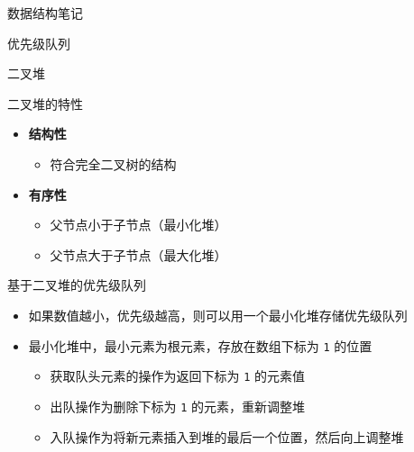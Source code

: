 \documentclass[
  ignorenonframetext,
]{beamer}
\providecommand{\tightlist}{%
  \setlength{\itemsep}{0pt}\setlength{\parskip}{0pt}}
\begin{document}
\begin{frame}[fragile]{数据结构笔记}
\begin{block}{优先级队列}
\begin{block}{二叉堆}
\begin{block}{二叉堆的特性}
\protect{}\label{ux4e8cux53c9ux5806ux7684ux7279ux6027}
\begin{itemize}
\tightlist
\item
  \textbf{结构性}

  \begin{itemize}
  \tightlist
  \item
    符合完全二叉树的结构
  \end{itemize}
\item
  \textbf{有序性}

  \begin{itemize}
  \tightlist
  \item
    父节点小于子节点（最小化堆）
  \item
    父节点大于子节点（最大化堆）
  \end{itemize}
\end{itemize}
\end{block}
\end{block}

\begin{block}{基于二叉堆的优先级队列}
\protect{}\label{ux57faux4e8eux4e8cux53c9ux5806ux7684ux4f18ux5148ux7ea7ux961fux5217}
\begin{itemize}
\tightlist
\item
  如果数值越小，优先级越高，则可以用一个最小化堆存储优先级队列
\item
  最小化堆中，最小元素为根元素，存放在数组下标为 \texttt{1} 的位置

  \begin{itemize}
  \tightlist
  \item
    获取队头元素的操作为返回下标为 \texttt{1} 的元素值
  \item
    出队操作为删除下标为 \texttt{1} 的元素，重新调整堆
  \item
    入队操作为将新元素插入到堆的最后一个位置，然后向上调整堆
  \end{itemize}
\end{itemize}
\end{block}


\end{block}
\end{frame}
\end{document}
